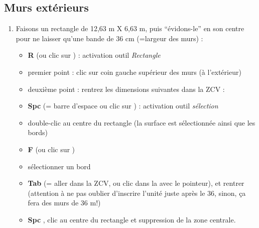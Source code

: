 \documentclass[a4paper,12pt,french]{sphinxmanual}
\begin{document}
\subsection{Murs extérieurs}
\label{init_su+acad/su1:murs-exterieurs}\begin{enumerate}
\item {} 
Faisons un rectangle de 12,63 m X 6,63 m, puis ``évidons-le'' en son centre pour ne laisser qu'une bande de 36 cm (=largeur des murs) :
\begin{itemize}
\item {} 
\textbf{R} (ou clic sur ) : activation outil \emph{Rectangle}

\item {} 
premier point : clic sur coin gauche supérieur des murs (à l'extérieur)

\item {} 
deuxième point : rentrez les dimensions suivantes dans la ZCV : 

\item {} 
\textbf{Spc} (= barre d'espace ou clic sur ) : activation outil \emph{sélection}

\item {} 
double-clic au centre du rectangle (la surface est sélectionnée ainsi que les bords)

\item {} 
\textbf{F} (ou clic sur )

\item {} 
sélectionner un bord

\item {} 
\textbf{Tab} (= aller dans la ZCV, ou clic dans la  avec le pointeur), et rentrer \sphinxcode{36cm} (attention à ne pas oublier d'inscrire l'unité  juste après le 36, sinon, ça fera des murs de 36 m!)

\item {} 
\textbf{Spc} , clic au centre du rectangle et suppression de la zone centrale.

\end{itemize}

\end{enumerate}
\end{document}
